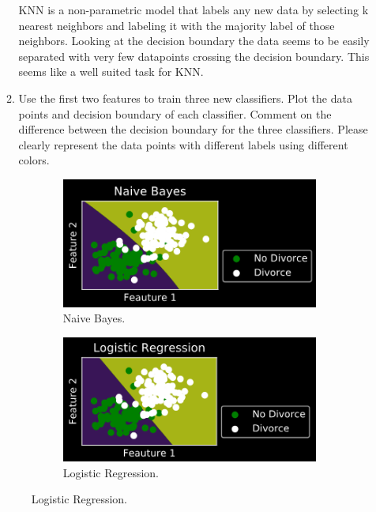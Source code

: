 \documentclass[twoside,10pt]{article}
\begin{document}
\begin{enumerate}
\begin{enumerate}
KNN is a non-parametric model that labels any new data by selecting k nearest neighbors and labeling it with the majority label of those neighbors.  Looking at the decision boundary the data seems to be easily separated with very few datapoints crossing the decision boundary.  This seems like a well suited task for KNN.



	\item Use the first two features to train three new classifiers. Plot the data points and decision boundary of each classifier. Comment on the difference between the decision boundary for the three classifiers. Please clearly represent the data points with different labels using different colors.
\end{enumerate}


\begin{figure}[h]
  \begin{subfigure}[b]{0.3\textwidth}
    \includegraphics[width=\textwidth]{nb.png}
    \caption{Naive Bayes.}
    \label{fig:f1}
  \end{subfigure}
  \hfill
  \begin{subfigure}[b]{0.3\textwidth}
    \includegraphics[width=\textwidth]{lr.png}
    \caption{Logistic Regression.}
    \label{fig:f2}

\end{subfigure}
\end{figure}
\end{enumerate}
\end{document}
